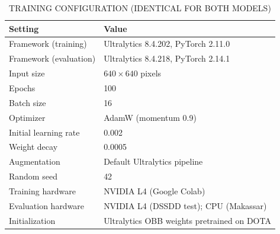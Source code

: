\documentclass[conference]{IEEEtran}
\begin{document}
\begin{table}[h!]
	\centering
	\caption{TRAINING CONFIGURATION (IDENTICAL FOR BOTH MODELS)}
	\begin{footnotesize}
	\begin{tabular}{ll}
		\hline
		\textbf{Setting} & \textbf{Value} \\
		\hline
		Framework (training) & Ultralytics 8.4.202, PyTorch 2.11.0 \\
		Framework (evaluation) & Ultralytics 8.4.218, PyTorch 2.14.1 \\
		Input size & $640 \times 640$ pixels \\
		Epochs & 100 \\
		Batch size & 16 \\
		Optimizer & AdamW (momentum 0.9) \\
		Initial learning rate & 0.002 \\
		Weight decay & 0.0005 \\
		Augmentation & Default Ultralytics pipeline \\
		Random seed & 42 \\
		Training hardware & NVIDIA L4 (Google Colab) \\
		Evaluation hardware & NVIDIA L4 (DSSDD test); CPU (Makassar) \\
		Initialization & Ultralytics OBB weights pretrained on DOTA \\
		\hline
	\end{tabular}
	\label{tab:train}
	\end{footnotesize}
\end{table}
\end{document}
